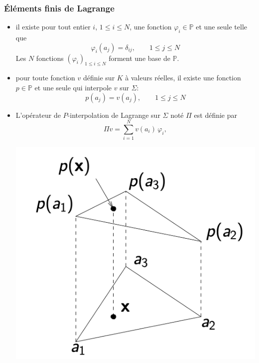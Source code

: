 \documentclass{beamer}
\begin{document}
\begin{frame}
\frametitle{Éléments finis de Lagrange}
  \begin{itemize}
  \item  
   il existe  pour tout entier $i$, $1\leq i \leq N$, une fonction $\varphi_i\in \mathbb{P}$ et une seule telle que
 \begin{equation}
                          \varphi_i(a_j)=\delta_{ij},\qquad 1\leq j \leq N
                          \label{unisolvantCarac}
\end{equation}
Les $N$ fonctions $(\varphi_i)_{1\leq i \leq N}$ forment une base de $\mathbb{P}$.
\item pour toute fonction $v$ définie sur $K$ à valeurs réelles, il existe une fonction $p\in      \mathbb{P}$ et une seule qui interpole $v$ sur $\Sigma$:
 \begin{equation}
                          p(a_j)=v(a_j),\qquad 1\leq j \leq N
                          \label{conditionNoeud}
\end{equation}

\item L'opérateur de $P$-interpolation de Lagrange sur $\Sigma$ noté $\Pi $ est définie par
\begin{equation}
\Pi v = \sum_{i=1}^Nv(a_i)\,\varphi_i,
\label{interpolation}
\end{equation}
\begin{center}
\includegraphics[scale=0.115]{unisolvant.png} 
\end{center}
\end{itemize}
\end{frame}
\end{document}
